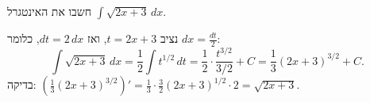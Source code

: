 
\begin{question}
חשבו את האינטגרל $\displaystyle\int\sqrt{2x+3}\,dx$.
\end{question}

\begin{solution}
נציב $t=2x+3$, ואז $dt=2\,dx$, כלומר $dx=\frac{dt}{2}$:
\[ \int\sqrt{2x+3}\,dx=\frac12\int t^{1/2}\,dt=\frac12\cdot\frac{t^{3/2}}{3/2}+C=\frac13(2x+3)^{3/2}+C. \]
בדיקה: $\left(\frac13(2x+3)^{3/2}\right)'=\frac13\cdot\frac32(2x+3)^{1/2}\cdot 2=\sqrt{2x+3}$.
\end{solution}
